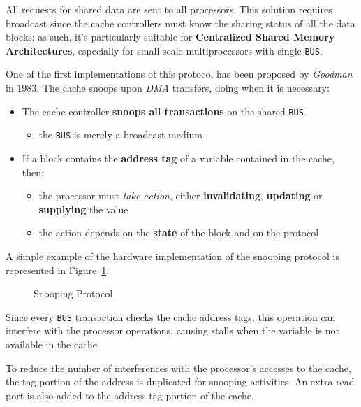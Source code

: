 \documentclass[english]{article}
\begin{document}
All requests for shared data are sent to all processors.
This solution requires broadcast since the cache controllers must know the sharing status of all the data blocks;
as such, it's particularly suitable for \textbf{Centralized Shared Memory Architectures}, especially for small-scale multiprocessors with single \texttt{BUS}.

\bigskip
One of the first implementations of this protocol has been proposed by \textit{Goodman} in \(1983\).
The cache snoops upon \textit{DMA} transfers, doing  when it is necessary:

\begin{itemize}
  \item The cache controller \textbf{snoops all transactions} on the shared \texttt{BUS}
        \begin{itemize}
          \item the \texttt{BUS} is merely a broadcast medium
        \end{itemize}
  \item If a block contains the \textbf{address tag} of a variable contained in the cache, then:
        \begin{itemize}
          \item the processor must \textit{take action}, either \textbf{invalidating}, \textbf{updating} or \textbf{supplying} the value
          \item the action depends on the \textbf{state} of the block and on the protocol
        \end{itemize}
\end{itemize}

A simple example of the hardware implementation of the snooping protocol is represented in Figure~\ref{fig:snooping-protocol}.

\begin{figure}[htbp]
  \bigskip
  \centering
  \caption{Snooping Protocol}
  \label{fig:snooping-protocol}
  \bigskip
\end{figure}

\bigskip
Since every \texttt{BUS} transaction checks the cache address tags, this operation can interfere with the processor operations, causing stalls when the variable is not available in the cache.

To reduce the number of interferences with the processor's accesses to the cache, the tag portion of the address is duplicated for snooping activities.
An extra read port is also added to the address tag portion of the cache.
\end{document}
